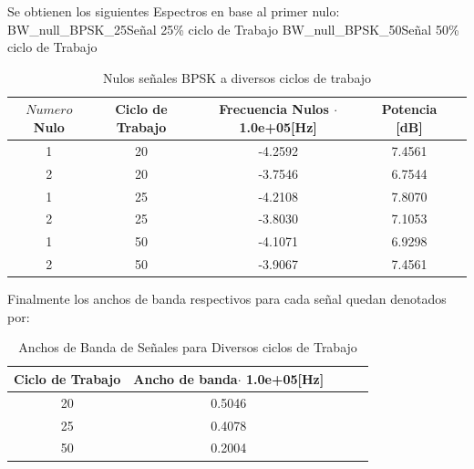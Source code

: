 \documentclass[letterpaper, titlepage]{article}
\begin{document}
\begin{enumerate}[a)]
					Se obtienen los siguientes Espectros en base al primer nulo:\\
							 {BW_null_BPSK_25}{\label{fig:sim}}{Señal 25\% ciclo de Trabajo}
							 {BW_null_BPSK_50}{\label{fig:sim}}{Señal 50\% ciclo de Trabajo}\\
	 
					\begin{table}[ht]
						\centering
						\begin{tabular}{c c c c c}
							$Numero$ Nulo & Ciclo de Trabajo & Frecuencia Nulos $\cdot$ 1.0e+05[Hz] & Potencia [dB]\\
							\hline
							1 & 20 & -4.2592 & 7.4561  \\
							2 & 20 & -3.7546 & 6.7544	\\
							1 & 25 & -4.2108 & 7.8070  \\
							2 & 25 & -3.8030 & 7.1053   \\
							1 & 50 & -4.1071 & 6.9298   \\
							2 & 50 & -3.9067 & 7.4561   \\
		
						\end{tabular}
						\caption{Nulos señales BPSK a diversos ciclos de trabajo}
						\label{tab:tabla1}
					\end{table}

					\begin{center}
						Finalmente los anchos de banda respectivos para cada señal quedan denotados por:
					\end{center}

					\begin{table}[ht]
						\centering
						\begin{tabular}{c c c c c}
							Ciclo de Trabajo & Ancho de banda$\cdot$ 1.0e+05[Hz] \\
							\hline
							20 & 0.5046   \\
							25 & 0.4078	  \\
							50 & 0.2004   \\
						\end{tabular}
						\caption{Anchos de Banda de Señales para Diversos ciclos de Trabajo}
						\label{tab:tabla1}
					\end{table}	
			\end{enumerate}
			\newpage
\end{document}
